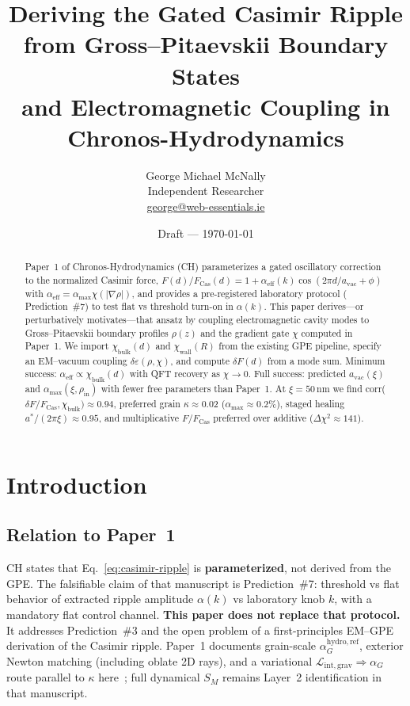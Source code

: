 \documentclass[11pt,a4paper]{article}
\title{%
  Deriving the Gated Casimir Ripple from Gross--Pitaevskii Boundary States\\
  and Electromagnetic Coupling in Chronos-Hydrodynamics%
}
\author{%
  George Michael McNally\\[0.25em]
  \small Independent Researcher\\[0.15em]
  \small \href{mailto:george@web-essentials.ie}{george@web-essentials.ie}%
}
\date{Draft --- \today}
\begin{document}
\maketitle

\begin{abstract}
Paper~1 of Chronos-Hydrodynamics (CH) parameterizes a gated oscillatory correction to the normalized Casimir force,
$F(d)/F_{\mathrm{Cas}}(d) = 1 + \alpha_{\mathrm{eff}}(k)\cos(2\pi d/a_{\mathrm{vac}} + \phi)$ with
$\alpha_{\mathrm{eff}} = \alpha_{\max}\chi(|\nabla\rho|)$, and provides a pre-registered laboratory protocol
( Prediction~\#7) to test flat vs threshold turn-on in $\alpha(k)$.
This paper derives---or perturbatively motivates---that ansatz by coupling electromagnetic cavity modes to
Gross--Pitaevskii boundary profiles $\rho(z)$ and the gradient gate $\chi$ computed in Paper~1.
We import $\chi_{\mathrm{bulk}}(d)$ and $\chi_{\mathrm{wall}}(R)$ from the existing GPE pipeline, specify an
EM--vacuum coupling $\delta\varepsilon(\rho,\chi)$, and compute $\delta F(d)$ from a mode sum.
Minimum success: $\alpha_{\mathrm{eff}} \propto \chi_{\mathrm{bulk}}(d)$ with QFT recovery as $\chi \to 0$.
Full success: predicted $a_{\mathrm{vac}}(\xi)$ and $\alpha_{\max}(\xi,\rho_{\mathrm{in}})$ with fewer free parameters than Paper~1.
At $\xi=50$\,nm we find corr($\delta F/F_{\mathrm{Cas}},\chi_{\mathrm{bulk}})\approx 0.94$, preferred grain $\kappa\approx 0.02$ ($\alpha_{\max}\approx 0.2\%$),
staged healing $a^*/(2\pi\xi)\approx 0.95$, and multiplicative $F/F_{\mathrm{Cas}}$ preferred over additive ($\Delta\chi^2\approx 141$).
\end{abstract}

\section{Introduction}
\label{sec:intro}

\subsection{Relation to Paper~1}

CH \cite{CHPaper1} states that Eq.~\eqref{eq:casimir-ripple} is \textbf{parameterized}, not derived from the GPE.
The falsifiable claim of that manuscript is Prediction~\#7: threshold vs flat behavior of extracted ripple amplitude $\alpha(k)$
vs laboratory knob $k$, with a mandatory flat control channel.
\textbf{This paper does not replace that protocol.} It addresses Prediction~\#3 and the open problem of a
first-principles EM--GPE derivation of the Casimir ripple.
Paper~1 documents grain-scale $\alpha_G^{\mathrm{hydro,ref}}$, exterior Newton matching (including oblate 2D rays), and a variational $\mathcal{L}_{\mathrm{int,grav}} \Rightarrow \alpha_G$ route parallel to $\kappa$ here~\cite{CHPaper1}; full dynamical $S_M$ remains Layer~2 identification in that manuscript.
\end{document}
